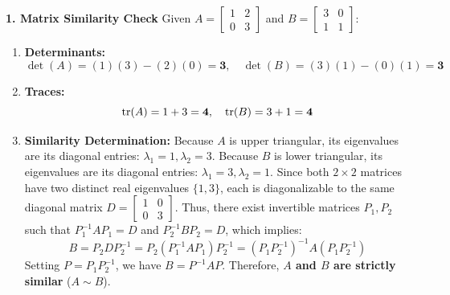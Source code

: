\textbf{1. Matrix Similarity Check}
Given $A = \begin{bmatrix} 1 & 2 \\ 0 & 3 \end{bmatrix}$ and $B = \begin{bmatrix} 3 & 0 \\ 1 & 1 \end{bmatrix}$:
\begin{enumerate}
    \item \textbf{Determinants:}
    \begin{equation*}
    \det(A) = (1)(3) - (2)(0) = \mathbf{3}, \quad \det(B) = (3)(1) - (0)(1) = \mathbf{3}
    \end{equation*}
    \item \textbf{Traces:}
    \begin{equation*}
    \operatorname{tr}(A) = 1 + 3 = \mathbf{4}, \quad \operatorname{tr}(B) = 3 + 1 = \mathbf{4}
    \end{equation*}
    \item \textbf{Similarity Determination:}
    Because $A$ is upper triangular, its eigenvalues are its diagonal entries: $\lambda_1 = 1, \lambda_2 = 3$.
    Because $B$ is lower triangular, its eigenvalues are its diagonal entries: $\lambda_1 = 3, \lambda_2 = 1$.
    Since both $2 \times 2$ matrices have two distinct real eigenvalues $\{1, 3\}$, each is diagonalizable to the same diagonal matrix $D = \begin{bmatrix} 1 & 0 \\ 0 & 3 \end{bmatrix}$.
    Thus, there exist invertible matrices $P_1, P_2$ such that $P_1^{-1} A P_1 = D$ and $P_2^{-1} B P_2 = D$, which implies:
    \begin{equation*}
    B = P_2 D P_2^{-1} = P_2 (P_1^{-1} A P_1) P_2^{-1} = (P_1 P_2^{-1})^{-1} A (P_1 P_2^{-1})
    \end{equation*}
    Setting $P = P_1 P_2^{-1}$, we have $B = P^{-1} A P$. Therefore, \textbf{$A$ and $B$ are strictly similar} ($A \sim B$).
\end{enumerate}

